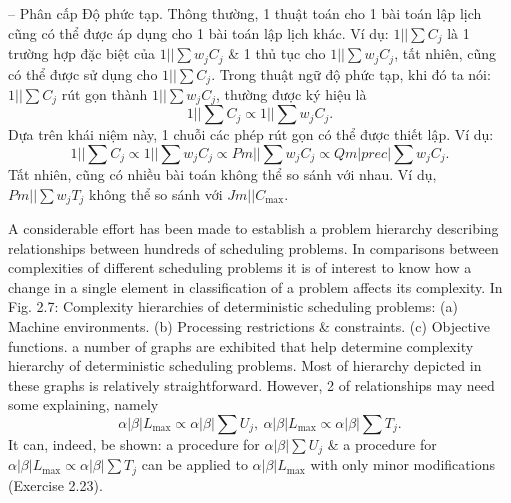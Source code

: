 \documentclass{article}
\begin{document}
\begin{itemize}
\begin{itemize}
        -- {\sf Phân cấp Độ phức tạp.} Thông thường, 1 thuật toán cho 1 bài toán lập lịch cũng có thể được áp dụng cho 1 bài toán lập lịch khác. Ví dụ: $1||\sum C_j$ là 1 trường hợp đặc biệt của $1||\sum w_jC_j$ \& 1 thủ tục cho $1||\sum w_jC_j$, tất nhiên, cũng có thể được sử dụng cho $1||\sum C_j$. Trong thuật ngữ độ phức tạp, khi đó ta nói: $1||\sum C_j$ rút gọn thành $1||\sum w_jC_j$, thường được ký hiệu là
        \begin{equation*}
            1||\sum C_j\propto1||\sum w_jC_j.
        \end{equation*}
        Dựa trên khái niệm này, 1 chuỗi các phép rút gọn có thể được thiết lập. Ví dụ:
        \begin{equation*}
            1||\sum C_j\propto1||\sum w_jC_j\propto Pm||\sum w_jC_j\propto Qm|prec|\sum w_jC_j.
        \end{equation*}
        Tất nhiên, cũng có nhiều bài toán không thể so sánh với nhau. Ví dụ, $Pm||\sum w_jT_j$ không thể so sánh với $Jm||C_{\max}$.

        A considerable effort has been made to establish a problem hierarchy describing relationships between hundreds of scheduling problems. In comparisons between complexities of different scheduling problems it is of interest to know how a change in a single element in classification of a problem affects its complexity. In {\sf Fig. 2.7: Complexity hierarchies of deterministic scheduling problems: (a) Machine environments. (b) Processing restrictions \& constraints. (c) Objective functions.} a number of graphs are exhibited that help determine complexity hierarchy of deterministic scheduling problems. Most of hierarchy depicted in these graphs is relatively straightforward. However, 2 of relationships may need some explaining, namely
        \begin{equation*}
            \alpha|\beta|L_{\max}\propto\alpha|\beta|\sum U_j,\ \alpha|\beta|L_{\max}\propto\alpha|\beta|\sum T_j.
        \end{equation*}
        It can, indeed, be shown: a procedure for $\alpha|\beta|\sum U_j$ \& a procedure for $\alpha|\beta|L_{\max}\propto\alpha|\beta|\sum T_j$ can be applied to $\alpha|\beta|L_{\max}$ with only minor modifications (Exercise 2.23).


\end{itemize}
\end{itemize}
\end{document}
